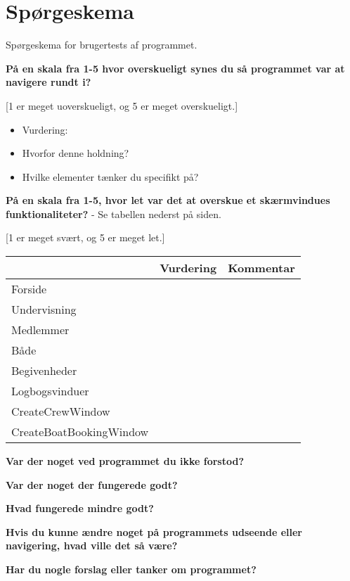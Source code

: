 \chapter{Spørgeskema}\label{bilag:SporgeSkema}
Spørgeskema for brugertests af programmet.

\textbf{På en skala fra 1-5 hvor overskueligt synes du så programmet var at navigere rundt i?}

[1 er meget uoverskueligt, og 5 er meget overskueligt.]

\begin{itemize}
\item Vurdering: 
\item Hvorfor denne holdning? 
\item Hvilke elementer tænker du specifikt på?
\end{itemize}

\textbf{På en skala fra 1-5, hvor let var det at overskue et skærmvindues funktionaliteter?} - Se tabellen nederst på siden.

[1 er meget svært, og 5 er meget let.]

\begin{table}\label{TabelVurdering}
    \begin{tabular}{l|l|l}
    ~                       & Vurdering & Kommentar \\ \hline
    Forside                 & ~         & ~         \\
    Undervisning            & ~         & ~         \\
    Medlemmer               & ~         & ~         \\
    Både                    & ~         & ~         \\
    Begivenheder            & ~         & ~         \\
    Logbogsvinduer          & ~         & ~         \\
    CreateCrewWindow        & ~         & ~         \\
    CreateBoatBookingWindow & ~         & ~         \\
    \end{tabular}
\end{table}

\textbf{Var der noget ved programmet du ikke forstod?}

\textbf{Var der noget der fungerede godt?}



\textbf{Hvad fungerede mindre godt?}

\textbf{Hvis du kunne ændre noget på programmets udseende eller navigering, hvad ville det så være?}

\textbf{Har du nogle forslag eller tanker om programmet?}
